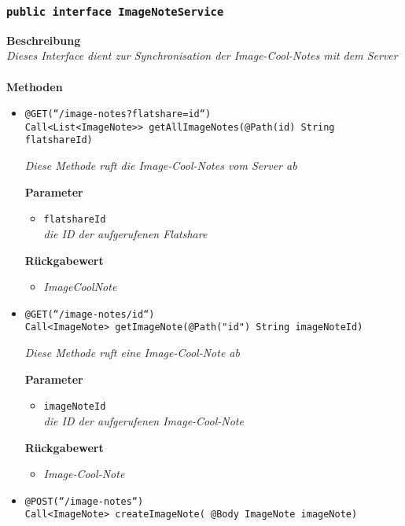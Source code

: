 	\subsubsection{\texttt{public interface ImageNoteService }}
	\textbf{Beschreibung}\\
	\textit{Dieses Interface dient zur Synchronisation der Image-Cool-Notes mit dem Server}\\
\\
	\textbf{Methoden} 
		\begin{itemize}
		\item\texttt{{@GET(``/image-notes?flatshare={id}``)\\
Call<List<ImageNote>{}> getAllImageNotes(@Path(\grqq id\grqq) String flatshareId)}}

		\textit{Diese Methode ruft die Image-Cool-Notes vom Server ab}

		\textbf{Parameter} 
			\begin{itemize}
				\item\texttt{flatshareId}\\
		 		\textit{die ID der aufgerufenen Flatshare}
	 		\end{itemize}

		\textbf{Rückgabewert} 
		\begin{itemize}
		\item\textit{ImageCoolNote}
		\end{itemize}
		
      \item\texttt{{@GET(``/image-notes/{id}``)\\ Call<ImageNote> getImageNote(@Path("\grqq id\grqq") String imageNoteId)}}

		\textit{Diese Methode ruft eine Image-Cool-Note ab }

		\textbf{Parameter} 
			\begin{itemize}
				\item\texttt{imageNoteId}\\
		 		\textit{die ID der aufgerufenen Image-Cool-Note}
	 		\end{itemize}

		\textbf{Rückgabewert} 
		\begin{itemize}
		\item\textit{Image-Cool-Note}
		\end{itemize}
		

	\item\texttt{{@POST(``/image-notes``)\\ Call<ImageNote> createImageNote( @Body ImageNote imageNote)}}


\end{itemize}
